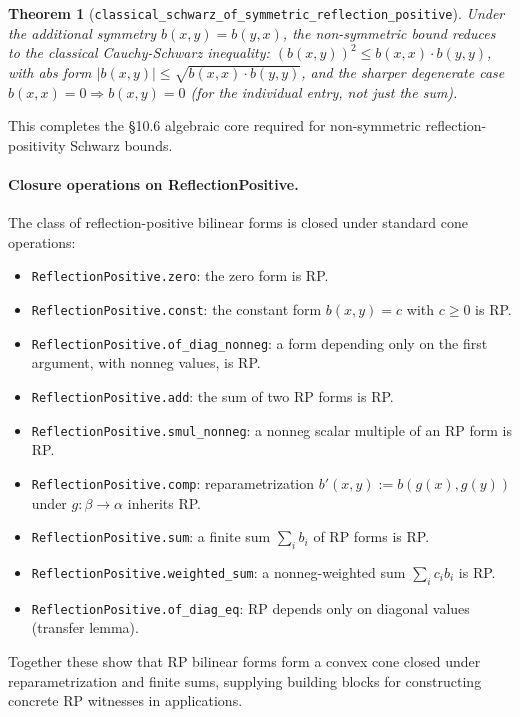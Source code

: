 \documentclass[a4paper,11pt]{article}
\newtheorem{theorem}{Theorem}
\begin{document}
\begin{theorem}[\texttt{classical\_schwarz\_of\_symmetric\_reflection\_positive}]
Under the additional symmetry $b(x, y) = b(y, x)$, the non-symmetric
bound reduces to the classical Cauchy-Schwarz inequality:
$(b(x, y))^2 \le b(x, x) \cdot b(y, y)$, with abs form
$|b(x, y)| \le \sqrt{b(x, x) \cdot b(y, y)}$, and the sharper
degenerate case $b(x, x) = 0 \Rightarrow b(x, y) = 0$ (for the
individual entry, not just the sum).
\end{theorem}

This completes the §10.6 algebraic core required for non-symmetric
reflection-positivity Schwarz bounds.

\paragraph{Closure operations on ReflectionPositive.}

The class of reflection-positive bilinear forms is closed under
standard cone operations:

\begin{itemize}
\item \texttt{ReflectionPositive.zero}: the zero form is RP.
\item \texttt{ReflectionPositive.const}: the constant form $b(x, y) = c$ with $c \ge 0$ is RP.
\item \texttt{ReflectionPositive.of\_diag\_nonneg}: a form depending only on the first argument, with nonneg values, is RP.
\item \texttt{ReflectionPositive.add}: the sum of two RP forms is RP.
\item \texttt{ReflectionPositive.smul\_nonneg}: a nonneg scalar multiple of an RP form is RP.
\item \texttt{ReflectionPositive.comp}: reparametrization $b'(x, y) := b(g(x), g(y))$ under $g : \beta \to \alpha$ inherits RP.
\item \texttt{ReflectionPositive.sum}: a finite sum $\sum_i b_i$ of RP forms is RP.
\item \texttt{ReflectionPositive.weighted\_sum}: a nonneg-weighted sum $\sum_i c_i b_i$ is RP.
\item \texttt{ReflectionPositive.of\_diag\_eq}: RP depends only on diagonal values (transfer lemma).
\end{itemize}

Together these show that RP bilinear forms form a convex cone closed
under reparametrization and finite sums, supplying building blocks
for constructing concrete RP witnesses in applications.
\end{document}

